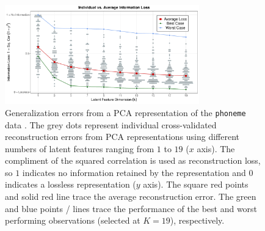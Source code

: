 \begin{figure}
    \centering
    \includegraphics[width=0.75\textwidth]{figures/info-loss.pdf}
    \caption{Generalization errors from a PCA representation of the \texttt{phoneme} data \parencite{hastie_elements_2009}. The grey dots represent individual cross-validated reconstruction errors from PCA representations using different numbers of latent features ranging from $1$ to $19$ ($x$ axis).
    The compliment of the squared correlation is used as reconstruction loss, so $1$ indicates no information retained by the representation and $0$ indicates a lossless representation ($y$ axis).
    The square red points and solid red line trace the average reconstruction error. The green and blue points / lines trace the performance of the best and worst performing observations (selected at $K=19$), respectively.}
    \label{fig:ind-losses}
\end{figure}


